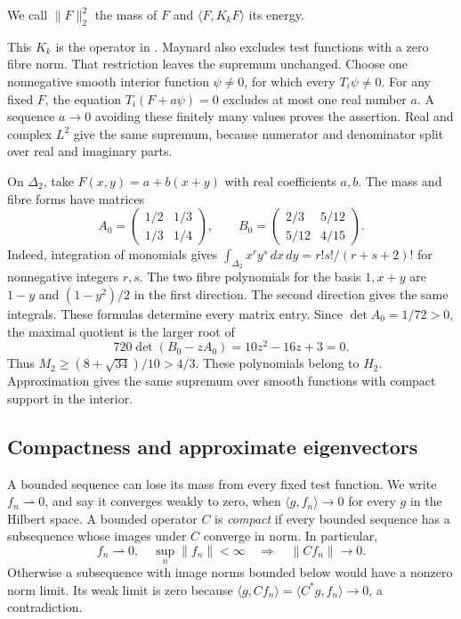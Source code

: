 \documentclass[11pt]{article}
\newcommand{\ip}[2]{\langle #1,#2\rangle}
\newcommand{\norm}[1]{\lVert #1\rVert}
\begin{document}
We call $\|F\|_2^2$ the mass of $F$ and $\langle F,K_kF\rangle$ its energy.

This $K_k$ is the operator in \cite[(7.1)--(7.2), p.~405]{Maynard}.
Maynard also excludes test functions with a zero fibre norm.
That restriction leaves the supremum unchanged.  Choose one nonnegative
smooth interior function $\psi\ne0$, for which every $T_i\psi\ne0$.
For any fixed $F$, the equation $T_i(F+a\psi)=0$ excludes at most one
real number $a$.  A sequence $a\to0$ avoiding these finitely many values
proves the assertion.  Real and complex $L^2$ give the same supremum,
because numerator and denominator split over real and imaginary parts.

\begin{example}\label{ex:triangle-ritz}
On $\Delta_2$, take $F(x,y)=a+b(x+y)$ with real coefficients $a,b$.
The mass and fibre forms have matrices
\[
 A_0=\begin{pmatrix}1/2&1/3\\1/3&1/4\end{pmatrix},\qquad
 B_0=\begin{pmatrix}2/3&5/12\\5/12&4/15\end{pmatrix}.
\]
Indeed, integration of monomials gives
$\int_{\Delta_2}x^ry^s\,dx\,dy=r!s!/(r+s+2)!$ for nonnegative
integers $r,s$.  The two fibre polynomials for the basis $1,x+y$
are $1-y$ and $(1-y^2)/2$ in the first direction.
The second direction gives the same integrals.
These formulas determine every matrix entry.
Since $\det A_0=1/72>0$, the maximal quotient is the larger root of
\[
          720\det(B_0-zA_0)=10z^2-16z+3=0.
\]
Thus $M_2\geq(8+\sqrt{34})/10>4/3$.
These polynomials belong to $H_2$.  Approximation gives the same supremum
over smooth functions with compact support in the interior.
\end{example}

\subsection{Compactness and approximate eigenvectors}

A bounded sequence can lose its mass from every fixed test function.
We write $f_n\rightharpoonup0$, and say it converges weakly to zero,
when $\ip g{f_n}\to0$ for every $g$ in the Hilbert space.
A bounded operator $C$ is \emph{compact} if every bounded sequence has a
subsequence whose images under $C$ converge in norm.
In particular,
\begin{equation}\label{eq:compact-weak}
 f_n\rightharpoonup0,\quad \sup_n\norm{f_n}<\infty
                    \quad\Longrightarrow\quad\norm{Cf_n}\to0.
\end{equation}
Otherwise a subsequence with image norms bounded below would have a
nonzero norm limit.  Its weak limit is zero because
$\ip g{Cf_n}=\ip{C^*g}{f_n}\to0$, a contradiction.
\end{document}
